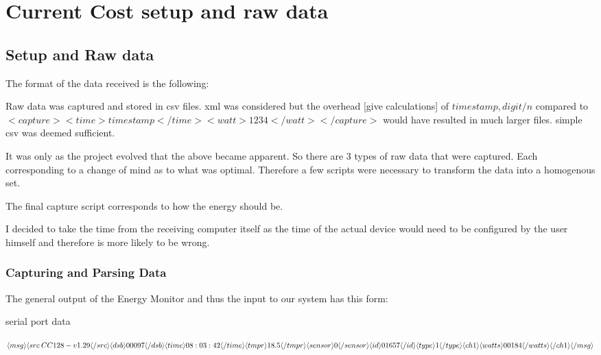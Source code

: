 \chapter{Current Cost setup and raw data}

\section{Setup and Raw data}

The format of the data received is the following:


Raw data was captured and stored in csv files. xml was considered but the overhead [give calculations] of $timestamp,digit/n$ compared to $<capture><time>timestamp</time><watt>1234</watt></capture>$ would have resulted in much larger files. simple csv was deemed sufficient.

It was only as the project evolved that the above became apparent. So there are 3 types of raw data that were captured. Each corresponding to a change of mind as to what was optimal. Therefore a few scripts were necessary to transform the data into a homogenous set.

The final capture script corresponds to how the energy should be.

I decided to take the time from the receiving computer itself as the time of the actual device would need to be configured by the user himself and therefore is more likely to be wrong.
\subsection{Capturing and Parsing Data}

The general output of the Energy Monitor and thus the input to our system has this form:

serial port data

$
\langle msg \rangle \\
\langle src\>CC128-v1.29\langle /src \rangle \\
\langle dsb \rangle00097\langle /dsb \rangle \\
\langle time \rangle 08:03:42 \langle /time \rangle \\
\langle tmpr \rangle 18.5 \langle /tmpr \rangle \\
\langle sensor \rangle 0 \langle /sensor \rangle \\
\langle id \rangle 01657 \langle /id \rangle \\
\langle type \rangle 1 \langle /type \rangle \\
\langle ch1 \rangle\langle watts \rangle 00184 \langle /watts \rangle \langle /ch1 \rangle \\
\langle /msg \rangle \\
$


